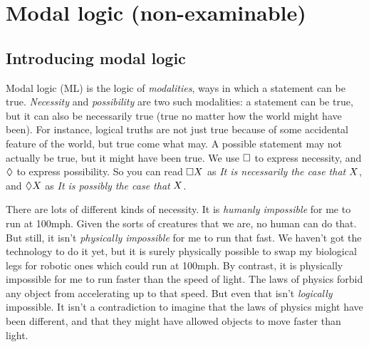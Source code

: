 
\part{Modal logic (non-examinable)}
\label{ch.ML}

%

\chapter{Introducing modal logic}
\label{Intro}

Modal logic (ML) is the logic of \emph{modalities}, ways in which a statement can be true. \emph{Necessity} and \emph{possibility} are two such modalities: a statement can be true, but it can also be necessarily true (true no matter how the world might have been). For instance, logical truths are not just true because of some accidental feature of the world, but true come what may. A possible statement may not actually be true, but it might have been true. We use $\Box$ to express necessity, and $\Diamond$ to express possibility. So you can read $\Box X$ as \emph{It is necessarily the case that} $X$, and $\Diamond X$ as \emph{It is possibly the case that} $X$.

There are lots of different kinds of necessity. It is \emph{humanly impossible} for me to run at 100mph. Given the sorts of creatures that we are, no human can do that. But still, it isn't \emph{physically impossible} for me to run that fast. We haven't got the technology to do it yet, but it is surely physically possible to swap my biological legs for robotic ones which could run at 100mph. By contrast, it is physically impossible for me to run faster than the speed of light. The laws of physics forbid any object from accelerating up to that speed. But even that isn't \emph{logically} impossible. It isn't a contradiction to imagine that the laws of physics might have been different, and that they might have allowed objects to move faster than light.

